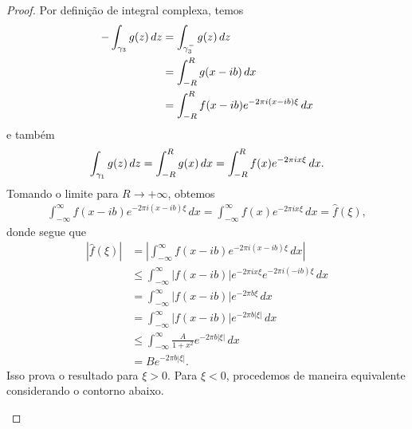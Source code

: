 \begin{proof}
            Por definição de integral complexa, temos
            \begin{align*}
                -\int_{\gamma_3} g(z) \, dz &= \int_{\gamma_3^-} g(z) \, dz \\
                                            &= \int_{-R}^R g(x-ib) \, dx \\
                                            &= \int_{-R}^R f(x-ib)e^{-2\pi i(x-ib)\xi} \, dx
            \end{align*}
            e também
            \begin{equation*}
                \int_{\gamma_1} g(z) \, dz = \int_{-R}^R g(x) \, dx = \int_{-R}^R f(x)e^{-2\pi ix\xi} \, dx.
            \end{equation*}
            Tomando o limite para $R\to +\infty$, obtemos
            \begin{align*}
                \int_{-\infty}^{\infty} f(x-ib)e^{-2\pi i(x-ib)\xi} \, dx
                =
                \int_{-\infty}^{\infty} f(x)e^{-2\pi ix\xi} \, dx
                =
                \widehat{f}(\xi),
            \end{align*}
            donde segue que
            \begin{align*}
                |\widehat{f}(\xi)| &=\left|\int_{-\infty}^{\infty} f(x-ib)e^{-2\pi i(x-ib)\xi} \, dx\right| \\
                                   &\leq\int_{-\infty}^{\infty}|f(x-ib)|e^{-2\pi ix\xi}e^{-2\pi i(-ib)\xi}\,dx \\
                                   &= \int_{-\infty}^{\infty}|f(x-ib)|e^{-2\pi b\xi} \,dx \\
                                   &= \int_{-\infty}^{\infty}|f(x-ib)|e^{-2\pi b|\xi|} \,dx \\
                                   &\leq \int_{-\infty}^{\infty} \frac{A}{1+x^2}e^{-2\pi b|\xi|} \, dx \\
                                   &= Be^{-2\pi b|\xi|}.
            \end{align*}
            Isso prova o resultado para $\xi > 0$. Para $\xi < 0$, procedemos de maneira equivalente considerando
            o contorno abaixo.
            \begin{figure}[H]
				\centering 
\end{figure}
\end{proof}
